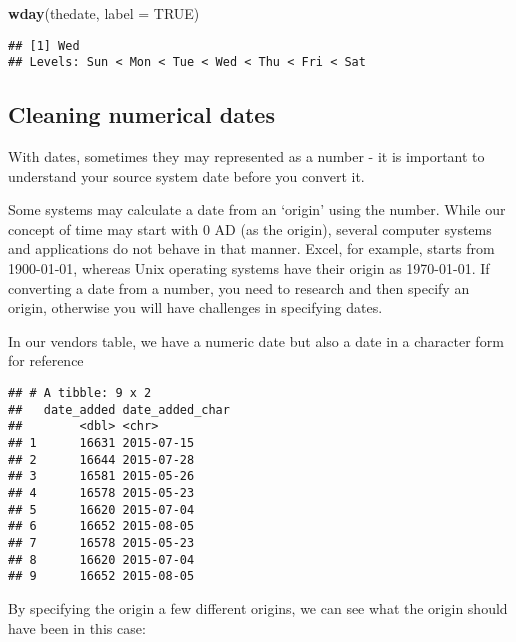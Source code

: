 \documentclass[
]{book}
\newenvironment{Shaded}{\begin{snugshade}}{\end{snugshade}}
\newcommand{\DataTypeTok}[1]{\textcolor[rgb]{0.13,0.29,0.53}{#1}}
\newcommand{\KeywordTok}[1]{\textcolor[rgb]{0.13,0.29,0.53}{\textbf{#1}}}
\newcommand{\NormalTok}[1]{#1}
\newcommand{\OperatorTok}[1]{\textcolor[rgb]{0.81,0.36,0.00}{\textbf{#1}}}
\newcommand{\OtherTok}[1]{\textcolor[rgb]{0.56,0.35,0.01}{#1}}
\newcommand{\StringTok}[1]{\textcolor[rgb]{0.31,0.60,0.02}{#1}}
\begin{document}
\begin{Shaded}
\begin{Highlighting}[]
\KeywordTok{wday}\NormalTok{(thedate, }\DataTypeTok{label =} \OtherTok{TRUE}\NormalTok{)}
\end{Highlighting}
\end{Shaded}

\begin{verbatim}
## [1] Wed
## Levels: Sun < Mon < Tue < Wed < Thu < Fri < Sat
\end{verbatim}

\hypertarget{cleaning-numerical-dates}{%
\subsection{Cleaning numerical dates}\label{cleaning-numerical-dates}}

With dates, sometimes they may represented as a number - it is important to understand your source system date before you convert it.

Some systems may calculate a date from an `origin' using the number. While our concept of time may start with 0 AD (as the origin), several computer systems and applications do not behave in that manner. Excel, for example, starts from 1900-01-01, whereas Unix operating systems have their origin as 1970-01-01. If converting a date from a number, you need to research and then specify an origin, otherwise you will have challenges in specifying dates.

In our vendors table, we have a numeric date but also a date in a character form for reference

\begin{Shaded}
\end{Shaded}

\begin{verbatim}
## # A tibble: 9 x 2
##   date_added date_added_char
##        <dbl> <chr>          
## 1      16631 2015-07-15     
## 2      16644 2015-07-28     
## 3      16581 2015-05-26     
## 4      16578 2015-05-23     
## 5      16620 2015-07-04     
## 6      16652 2015-08-05     
## 7      16578 2015-05-23     
## 8      16620 2015-07-04     
## 9      16652 2015-08-05
\end{verbatim}

By specifying the origin a few different origins, we can see what the origin should have been in this case:
\end{document}
